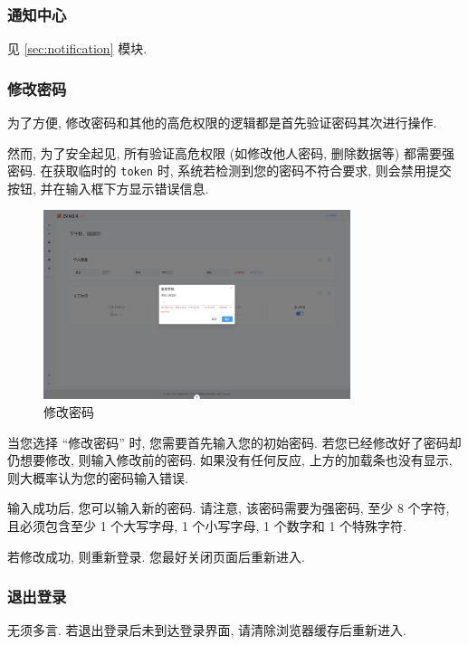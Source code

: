 \documentclass{article}
\begin{document}
\subsubsection{通知中心}

见 \ref{sec:notification} 模块.

\subsubsection{修改密码}

为了方便, 修改密码和其他的高危权限的逻辑都是首先验证密码其次进行操作.

然而, 为了安全起见, 所有验证高危权限 (如修改他人密码, 删除数据等) 都需要强密码. 在获取临时的 \texttt{token} 时, 系统若检测到您的密码不符合要求, 则会禁用提交按钮, 并在输入框下方显示错误信息.

\begin{figure}[H]
  \centering
  \includegraphics[width=0.8\textwidth]{../assets/image-20240303153008248.png}
  \caption{修改密码}
  \label{fig:change-password}
\end{figure}

当您选择 ``修改密码'' 时, 您需要首先输入您的初始密码. 若您已经修改好了密码却仍想要修改, 则输入修改前的密码. 如果没有任何反应, 上方的加载条也没有显示, 则大概率认为您的密码输入错误.

输入成功后, 您可以输入新的密码. 请注意, 该密码需要为强密码, 至少 8 个字符, 且必须包含至少 1 个大写字母, 1 个小写字母, 1 个数字和 1 个特殊字符.

若修改成功, 则重新登录. 您最好关闭页面后重新进入.

\subsubsection{退出登录}

无须多言. 若退出登录后未到达登录界面, 请清除浏览器缓存后重新进入.
\end{document}
